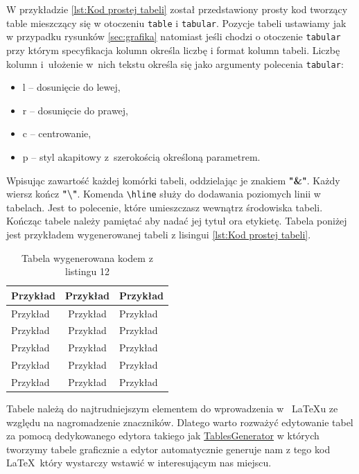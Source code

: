 W przykładzie \ref{lst:Kod prostej tabeli} został przedstawiony prosty kod tworzący table mieszczący się w otoczeniu \texttt{table} i \texttt{tabular}. Pozycje tabeli ustawiamy jak w przypadku rysunków \ref{sec:grafika} natomiast jeśli chodzi o otoczenie \texttt{tabular} przy którym specyfikacja kolumn określa liczbę i format kolumn tabeli. Liczbę kolumn i~ułożenie w~nich tekstu określa się jako argumenty polecenia \texttt{tabular}:
\begin{itemize}
	\item l -- dosunięcie do lewej,
	\item r -- dosunięcie do prawej,
	\item c -- centrowanie,
	\item p -- styl akapitowy z~szerokością określoną parametrem.
\end{itemize}
Wpisując zawartość każdej komórki tabeli, oddzielając je znakiem \textbf{"\&"}. Każdy wiersz kończ \textbf{"\textbackslash"}.
Komenda \texttt{\textbackslash hline} służy do dodawania poziomych linii w tabelach. Jest to polecenie, które umieszczasz wewnątrz środowiska tabeli.
Kończąc tabele należy pamiętać aby nadać jej tytuł ora etykietę.
Tabela poniżej jest przykładem wygenerowanej tabeli z lisingui \ref{lst:Kod prostej tabeli}.
\begin{table}[H]
 \centering
  \begin{tabular}{p{2.5cm}c|l}
    Przykład  &   Przykład           &   Przykład\\\hline\hline
    Przykład  &   Przykład           &   Przykład\\\hline
    Przykład  &   Przykład           &   Przykład \\\hline
    Przykład  &   Przykład           &   Przykład\\\hline
    Przykład  &   Przykład           &   Przykład\\\hline
    Przykład  &   Przykład           &   Przykład
  \end{tabular}
 \caption{\label{tab:Tabela wygenerowana kodem z listingu 12}Tabela wygenerowana kodem z listingu 12}
\end{table}
Tabele należą do najtrudniejszym elementem do wprowadzenia w~
\LaTeX{u} ze względu na nagromadzenie znaczników. Dlatego warto rozważyć edytowanie tabel za pomocą dedykowanego edytora takiego jak \href{https://www.tablesgenerator.com}{TablesGenerator} w których tworzymy tabele graficznie a edytor automatycznie generuje nam z tego kod \LaTeX\ który wystarczy wstawić w interesującym nas miejscu.

